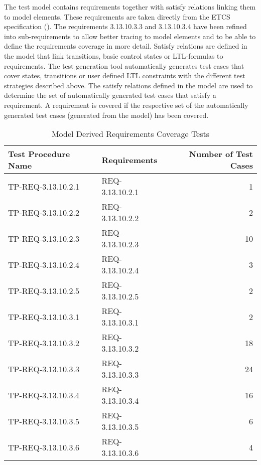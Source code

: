 The test model contains requirements together with satisfy relations
linking them to model elements. These requirements are taken directly
from the ETCS specification (\cite{ETCS}).
The requirements 3.13.10.3.3 and 3.13.10.3.4 have been
refined into sub-requirements to allow better tracing to model elements
and to be able to define the requirements coverage in more detail.
Satisfy relations are defined in the model that link transitions,
basic control states or LTL-formulas to requirements.
The test generation tool automatically generates test cases that
cover states, transitions or user defined LTL constraints with
the different test strategies described above.
The satisfy relations defined in the
model are used to determine the set of automatically generated
test cases that satisfy a requirement.
A requirement is covered if the respective set of the automatically
generated test cases (generated from the model) has been covered.

\begin{table}
\caption{Model Derived Requirements Coverage Tests}\label{tbl:derivedtest}
\tabsize
\centering
\begin{tabular}{p{40mm}p{30mm}r}
\hline\hline
Test Procedure Name & Requirements & Number of Test Cases\\
\hline
TP-REQ-3.13.10.2.1 & REQ-3.13.10.2.1 & 1\\
TP-REQ-3.13.10.2.2 & REQ-3.13.10.2.2 & 2\\
TP-REQ-3.13.10.2.3 & REQ-3.13.10.2.3 & 10\\
TP-REQ-3.13.10.2.4 & REQ-3.13.10.2.4 & 3\\
TP-REQ-3.13.10.2.5 & REQ-3.13.10.2.5 & 2\\
TP-REQ-3.13.10.3.1 & REQ-3.13.10.3.1 & 2\\
TP-REQ-3.13.10.3.2 & REQ-3.13.10.3.2 & 18\\
TP-REQ-3.13.10.3.3 & REQ-3.13.10.3.3 & 24\\
TP-REQ-3.13.10.3.4 & REQ-3.13.10.3.4 & 16\\
TP-REQ-3.13.10.3.5 & REQ-3.13.10.3.5 & 6\\
TP-REQ-3.13.10.3.6 & REQ-3.13.10.3.6 & 4\\
\hline\hline
\end{tabular}
\end{table}

